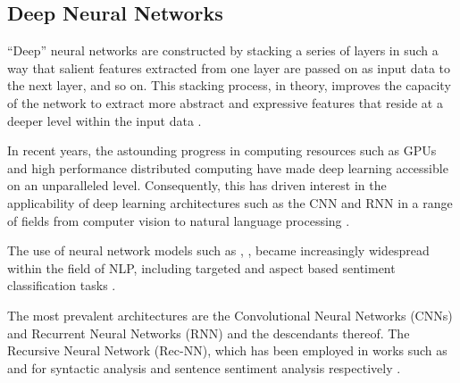 \documentclass[../../fyp.tex]{subfiles}
\begin{document}
\subsection{Deep Neural Networks}
\enquote{Deep} neural networks are constructed by stacking a series of layers in such a way that salient features extracted from one layer are passed on as input data to the next layer, and so on. This stacking process, in theory, improves the capacity of the network to extract more abstract and expressive features that reside at a deeper level within the input data \cite{zhang2018}.

In recent years, the astounding progress in computing resources such as GPUs and high performance distributed computing have made deep learning accessible on an unparalleled level. Consequently, this has driven interest in the applicability of deep learning architectures such as the CNN and RNN in a range of fields from computer vision to natural language processing \citep{goldberg2015,collobert2011}.

The use of neural network models such as \citet{lakkaraju2014}, \citet{vo2015}, \citet{nguyen2015} became increasingly widespread within the field of NLP, including targeted and aspect based sentiment classification tasks \citep{dong,wang,tang2016,tang2016b}.

The most prevalent architectures are the Convolutional Neural Networks (CNNs) and Recurrent Neural Networks (RNN) and the descendants thereof. The Recursive Neural Network (Rec-NN), which has been employed in works such as \cite{socher2011} and \cite{socher2013} for syntactic analysis and sentence sentiment analysis respectively \cite{zhang2018}.


\end{document}
